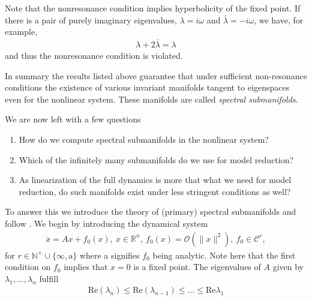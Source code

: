 \begin{remark}[]
	Note that the nonresonance condition implies hyperbolicity of the fixed point. If there is a pair of purely imaginary eigenvalues, $\lambda=i\omega$ and $\bar{\lambda}=-i\omega$, we have, for example,
\begin{align}
\lambda + 2\bar{\lambda} = \lambda
\end{align}
and thus the nonresonance condition is violated. 
\end{remark}

In summary the results listed above guarantee that under sufficient non-resonance conditions the existence of various invariant manifolds tangent to eigenspaces even for the nonlinear system. These manifolds are called \emph{spectral submanifolds}.

We are now left with a few questions
\begin{enumerate}
	\item How do we compute spectral submanifolds in the nonlinear system?
	\item Which of the infinitely many submanifolds do we use for model reduction?
	\item As linearization of the full dynamics is more that what we need for model reduction, do such manifolds exist under less stringent conditions as well?
\end{enumerate}

To answer this we introduce the theory of (primary) spectral submanifolds and follow \cite{Ponsioen2016}. We begin by introducing the dynamical system
\begin{align}
	\dot{x} = Ax+f_0(x),\ x \in \mathbb{R}^{n},\ f_{0}(x)=\mathcal{O}\left(\|x\|^2\right),\ f_0 \in \mathcal{C}^{r},
\end{align}
for $r \in \mathbb{N}^{+}\cup\{\infty , \textrm{a} \}$ where a signifies $f_0$ being analytic. Note here that the first condition on $f_0$ implies that $x=0$ is a fixed point. The eigenvalues of $A$ given by $\lambda_1,\ldots,\lambda_n$ fulfill
\begin{align}
	\textrm{Re} (\lambda_n) \leq  \textrm{Re} (\lambda_{n-1}) \leq \ldots \leq  \textrm{Re} \lambda_1 	
\end{align}

